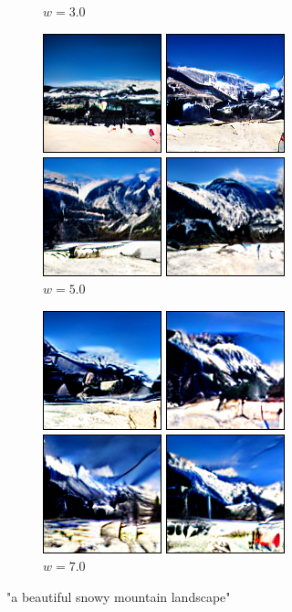 \documentclass[11pt,a4paper]{article}
\begin{document}
\begin{figure}[!ht]
\begin{subfigure}[b]{0.24\textwidth}
\caption{$w=3.0$}
\end{subfigure}
\begin{subfigure}[b]{0.24\textwidth}
\includegraphics[width=\linewidth]{figures/a_beautiful_snowy_mountain_landscape_5.png}
\caption{$w=5.0$}
\end{subfigure}
\begin{subfigure}[b]{0.24\textwidth}
\includegraphics[width=\linewidth]{figures/a_beautiful_snowy_mountain_landscape_7.png}
\caption{$w=7.0$}
\end{subfigure}
\caption{"a beautiful snowy mountain landscape"}
\end{figure}
\end{document}

